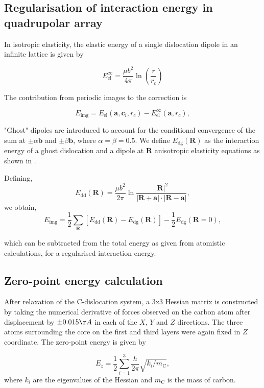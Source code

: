 \documentclass[a4paper,11pt]{article}
\begin{document}
\subsection{Regularisation of interaction energy in quadrupolar array}
\label{sec:org080a94c}
\label{sec:Ainteractionenergy}


In isotropic elasticity, the elastic energy of a single dislocation dipole in an
infinite lattice is given by


\[ E_{\text{el}}^{\infty} = \frac{\mu b^2}{4\pi} \ln \left( \frac{r}{r_{c}} \right)  \]

The contribution from periodic images to the correction is

\[ E_{\text{img} } = E_{\text{el}} (\mathbf{a}, \mathbf{c}_i , r_c) - E_{\text{el}}^{\infty}
   (\mathbf{a}, r_c),\]

"Ghost" dipoles are introduced to account for the conditional convergence of the sum at \(\pm\alpha
   \mathbf{b}\) and \(\pm \beta\mathbf{b}\), where \(\alpha = \beta = 0.5\). We define \(E_{\text{dg}} (\mathbf{R})\) as the
interaction energy of a ghost dislocation and a dipole at \(\mathbf{R}\) anisotropic elasticity
equations as shown in \cite{Cai2003}.


Defining,
 \[ E_{\text{dd}} (\mathbf{R}) = \frac{\mu b^2}{2\pi}
   \ln \frac{|\mathbf{R}|^2}{|\mathbf{R}+\mathbf{a}|\cdot|\mathbf{R}-\mathbf{a}|},
   \]
we obtain,
\[ E_{\text{img}} = \frac{1}{2}\sum_{\mathbf{R}} [ E_{\text{dd}} (\mathbf{R}) - E_{\text{dg}} (\mathbf{R}) ] - \frac{1}{2}
   E_{\text{dg}} (\mathbf{R} = 0),  \]

which can be subtracted from the total energy as given from atomistic calculations, for a
regularised interaction energy.


\subsection{Zero-point energy calculation}
\label{sec:orgf38db6d}
\label{sec:zeropointenergy}

After relaxation of the C-dislocation system, a 3x3 Hessian matrix is constructed by taking the
numerical derivative of forces observed on the carbon atom after displacement by \(\pm 0.015 \AA\) in
each of the \(X\), \(Y\) and \(Z\) directions.  The three atoms surrounding the core on the first and
third layers were again fixed in \(Z\) coordinate. The zero-point energy is given by

\[ E_z = \frac{1}{2} \sum_{i=1}^3 \frac{h}{2\pi} \sqrt{ k_i /
   m_{\text{C}} },  \]
where \(k_i\) are the eigenvalues of the Hessian and \(m_\text{C}\) is
the mass of carbon.
\end{document}
